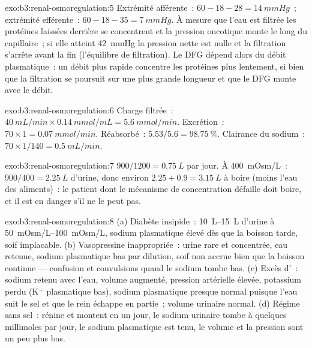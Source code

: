 \begin{solution}{exo:b3:renal-osmoregulation:5}
Extrémité afférente~: $60 - 18 - 28 = \qty{14}{mmHg}$~; extrémité
efférente~: $60 - 18 -
35 = \qty{7}{mmHg}$. À mesure que l'eau est filtrée les protéines
laissées derrière se concentrent et la pression oncotique monte le long
du capillaire~; si elle atteint \qty{42}{mmHg} la pression nette est
nulle et la filtration s'arrête avant la fin (l'équilibre de
filtration). Le DFG dépend alors du débit plasmatique~: un débit plus
rapide concentre les protéines plus lentement, si bien que la filtration
se poursuit sur une plus grande longueur et que le DFG monte avec le
débit.
\end{solution}

\begin{solution}{exo:b3:renal-osmoregulation:6}
Charge filtrée~: $\qty{40}{mL/min}\times\qty{0.14}{mmol/mL} =
\qty{5.6}{mmol/min}$. Excrétion~: $70\times 1 = \qty{0.07}{mmol/min}$.
Réabsorbé~: $5.53/5.6 = \qty{98.75}{\%}$. Clairance du sodium~: $70\times
1/140 = \qty{0.5}{mL/min}$.
\end{solution}

\begin{solution}{exo:b3:renal-osmoregulation:7}
$900/1200 = \qty{0.75}{L}$ par jour. À \qty{400}{mOsm/L}~: $900/400 =
\qty{2.25}{L}$ d'urine, donc environ $2.25 + 0.9 = \qty{3.15}{L}$ à
boire (moins l'eau des aliments)~: le patient dont le mécanisme de
concentration défaille doit boire, et il est en danger s'il ne le peut
pas.
\end{solution}

\begin{solution}{exo:b3:renal-osmoregulation:8}
(a) Diabète insipide~: \qtyrange{10}{15}{L} d'urine à
\qtyrange{50}{100}{mOsm/L}, sodium plasmatique élevé dès que la boisson
tarde, soif implacable. (b) Vasopressine inappropriée~: urine rare et
concentrée, eau retenue, sodium plasmatique bas par dilution, soif non
accrue bien que la boisson continue --- confusion et convulsions quand
le sodium tombe bas. (c) Excès d'~: sodium retenu avec
l'eau, volume augmenté, pression artérielle élevée, potassium perdu
(K$^{+}$ plasmatique bas), sodium plasmatique presque normal puisque
l'eau suit le sel et que le rein échappe en partie~; volume urinaire
normal. (d) Régime sans sel~: rénine et  montent en un jour,
le sodium urinaire tombe à quelques millimoles par jour, le sodium
plasmatique est tenu, le volume et la pression sont un peu plus bas.
\end{solution}

